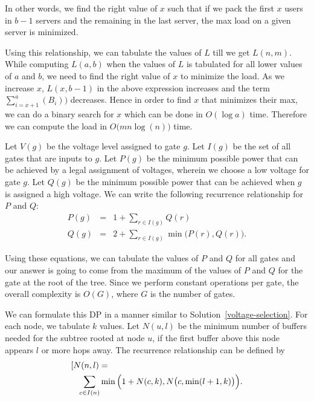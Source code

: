 In other words, we find the right value of $x$ such that if we pack
the first $x$ users in $b-1$ servers and the remaining in the last
server, the max load on a given server is minimized.

Using this relationship, we can tabulate the values of $L$ till we get
 $L(n,m)$.  While computing $L(a,b)$ when the values of $L$ is
tabulated for all lower values of $a$ and $b$, we need to find the
right value of $x$ to minimize the load. As we increase $x$, $L(x, b-1)$ in
the above expression increases and the term $ \sum_{i =
  x+1}^a(B_i))$ decreases. Hence in order to find $x$ that
minimizes their max, we can do a binary search for $x$ which can be
done in $O(\log a)$ time. Therefore we can compute the load in
$O\big(m n\log(n)\big)$ time.

Let $V(g)$ be the voltage level assigned
to gate $g$. Let $I(g)$ be the
set of all gates that are inputs to $g$. Let $P(g)$  be the minimum possible power that can be achieved by
a legal assignment of voltages, wherein we choose a low voltage for gate  $g$.
Let $Q(g)$ be the  minimum possible power that can be achieved  when
$g$ is assigned a high voltage.
We can write the following recurrence relationship for $P$ and $Q$: 
\begin{eqnarray*}
P(g) & = & 1 + \sum_{r \in I(g)}Q(r) \\
Q(g) & = & 2 + \sum_{r \in I(g)} \min \big( P(r), Q(r)\big).
\end{eqnarray*}

Using these equations, we can tabulate the values of $P$ and $Q$
for all gates and our answer is going to come from the maximum of the values of  $P$ and  $Q$ for the gate at the root of the tree.
Since we perform constant operations per gate, 
the overall complexity is $O(G)$, where $G$ is the number of gates.

We can formulate this DP in a manner similar to Solution~\ref{voltage-selection}.
For each node, we tabulate $k$ values. Let $N(u, l)$
be the minimum number of buffers needed for the subtree rooted at 
node $u$, if the first buffer above this node appears $l$ or more hops away. The
recurrence relationship can be defined by
{
\begin{eqnarray*}
\lefteqn{[N(n, l) =} \\
& & \sum_{c \in I(n)}\min\Big( 1 + N(c, k), N\big(c, \min(l+1, k)\big)\Big) .
\end{eqnarray*}
}


